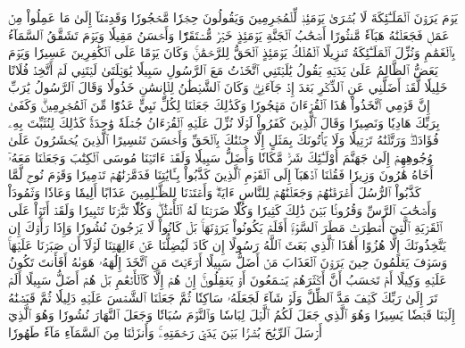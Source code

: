 يَوۡمَ يَرَوۡنَ ٱلۡمَلَـٰٓئِكَةَ لَا بُشۡرَىٰ يَوۡمَئِذٖ لِّلۡمُجۡرِمِينَ وَيَقُولُونَ حِجۡرٗا مَّحۡجُورٗا
وَقَدِمۡنَآ إِلَىٰ مَا عَمِلُواْ مِنۡ عَمَلٖ فَجَعَلۡنَٰهُ هَبَآءٗ مَّنثُورًا
أَصۡحَٰبُ ٱلۡجَنَّةِ يَوۡمَئِذٍ خَيۡرٞ مُّسۡتَقَرّٗا وَأَحۡسَنُ مَقِيلٗا
وَيَوۡمَ تَشَقَّقُ ٱلسَّمَآءُ بِٱلۡغَمَٰمِ وَنُزِّلَ ٱلۡمَلَـٰٓئِكَةُ تَنزِيلًا
ٱلۡمُلۡكُ يَوۡمَئِذٍ ٱلۡحَقُّ لِلرَّحۡمَٰنِۚ وَكَانَ يَوۡمًا عَلَى ٱلۡكَٰفِرِينَ عَسِيرٗا
وَيَوۡمَ يَعَضُّ ٱلظَّالِمُ عَلَىٰ يَدَيۡهِ يَقُولُ يَٰلَيۡتَنِي ٱتَّخَذۡتُ مَعَ ٱلرَّسُولِ سَبِيلٗا
يَٰوَيۡلَتَىٰ لَيۡتَنِي لَمۡ أَتَّخِذۡ فُلَانًا خَلِيلٗا
لَّقَدۡ أَضَلَّنِي عَنِ ٱلذِّكۡرِ بَعۡدَ إِذۡ جَآءَنِيۗ وَكَانَ ٱلشَّيۡطَٰنُ لِلۡإِنسَٰنِ خَذُولٗا
وَقَالَ ٱلرَّسُولُ يَٰرَبِّ إِنَّ قَوۡمِي ٱتَّخَذُواْ هَٰذَا ٱلۡقُرۡءَانَ مَهۡجُورٗا
وَكَذَٰلِكَ جَعَلۡنَا لِكُلِّ نَبِيٍّ عَدُوّٗا مِّنَ ٱلۡمُجۡرِمِينَۗ وَكَفَىٰ بِرَبِّكَ هَادِيٗا وَنَصِيرٗا
وَقَالَ ٱلَّذِينَ كَفَرُواْ لَوۡلَا نُزِّلَ عَلَيۡهِ ٱلۡقُرۡءَانُ جُمۡلَةٗ وَٰحِدَةٗۚ كَذَٰلِكَ لِنُثَبِّتَ بِهِۦ فُؤَادَكَۖ وَرَتَّلۡنَٰهُ تَرۡتِيلٗا
وَلَا يَأۡتُونَكَ بِمَثَلٍ إِلَّا جِئۡنَٰكَ بِٱلۡحَقِّ وَأَحۡسَنَ تَفۡسِيرًا
ٱلَّذِينَ يُحۡشَرُونَ عَلَىٰ وُجُوهِهِمۡ إِلَىٰ جَهَنَّمَ أُوْلَـٰٓئِكَ شَرّٞ مَّكَانٗا وَأَضَلُّ سَبِيلٗا
وَلَقَدۡ ءَاتَيۡنَا مُوسَى ٱلۡكِتَٰبَ وَجَعَلۡنَا مَعَهُۥٓ أَخَاهُ هَٰرُونَ وَزِيرٗا
فَقُلۡنَا ٱذۡهَبَآ إِلَى ٱلۡقَوۡمِ ٱلَّذِينَ كَذَّبُواْ بِـَٔايَٰتِنَا فَدَمَّرۡنَٰهُمۡ تَدۡمِيرٗا
وَقَوۡمَ نُوحٖ لَّمَّا كَذَّبُواْ ٱلرُّسُلَ أَغۡرَقۡنَٰهُمۡ وَجَعَلۡنَٰهُمۡ لِلنَّاسِ ءَايَةٗۖ وَأَعۡتَدۡنَا لِلظَّـٰلِمِينَ عَذَابًا أَلِيمٗا
وَعَادٗا وَثَمُودَاْ وَأَصۡحَٰبَ ٱلرَّسِّ وَقُرُونَۢا بَيۡنَ ذَٰلِكَ كَثِيرٗا
وَكُلّٗا ضَرَبۡنَا لَهُ ٱلۡأَمۡثَٰلَۖ وَكُلّٗا تَبَّرۡنَا تَتۡبِيرٗا
وَلَقَدۡ أَتَوۡاْ عَلَى ٱلۡقَرۡيَةِ ٱلَّتِيٓ أُمۡطِرَتۡ مَطَرَ ٱلسَّوۡءِۚ أَفَلَمۡ يَكُونُواْ يَرَوۡنَهَاۚ بَلۡ كَانُواْ لَا يَرۡجُونَ نُشُورٗا
وَإِذَا رَأَوۡكَ إِن يَتَّخِذُونَكَ إِلَّا هُزُوًا أَهَٰذَا ٱلَّذِي بَعَثَ ٱللَّهُ رَسُولًا
إِن كَادَ لَيُضِلُّنَا عَنۡ ءَالِهَتِنَا لَوۡلَآ أَن صَبَرۡنَا عَلَيۡهَاۚ وَسَوۡفَ يَعۡلَمُونَ حِينَ يَرَوۡنَ ٱلۡعَذَابَ مَنۡ أَضَلُّ سَبِيلًا
أَرَءَيۡتَ مَنِ ٱتَّخَذَ إِلَٰهَهُۥ هَوَىٰهُ أَفَأَنتَ تَكُونُ عَلَيۡهِ وَكِيلًا
أَمۡ تَحۡسَبُ أَنَّ أَكۡثَرَهُمۡ يَسۡمَعُونَ أَوۡ يَعۡقِلُونَۚ إِنۡ هُمۡ إِلَّا كَٱلۡأَنۡعَٰمِ بَلۡ هُمۡ أَضَلُّ سَبِيلًا
أَلَمۡ تَرَ إِلَىٰ رَبِّكَ كَيۡفَ مَدَّ ٱلظِّلَّ وَلَوۡ شَآءَ لَجَعَلَهُۥ سَاكِنٗا ثُمَّ جَعَلۡنَا ٱلشَّمۡسَ عَلَيۡهِ دَلِيلٗا
ثُمَّ قَبَضۡنَٰهُ إِلَيۡنَا قَبۡضٗا يَسِيرٗا
وَهُوَ ٱلَّذِي جَعَلَ لَكُمُ ٱلَّيۡلَ لِبَاسٗا وَٱلنَّوۡمَ سُبَاتٗا وَجَعَلَ ٱلنَّهَارَ نُشُورٗا
وَهُوَ ٱلَّذِيٓ أَرۡسَلَ ٱلرِّيَٰحَ بُشۡرَۢا بَيۡنَ يَدَيۡ رَحۡمَتِهِۦۚ وَأَنزَلۡنَا مِنَ ٱلسَّمَآءِ مَآءٗ طَهُورٗا
